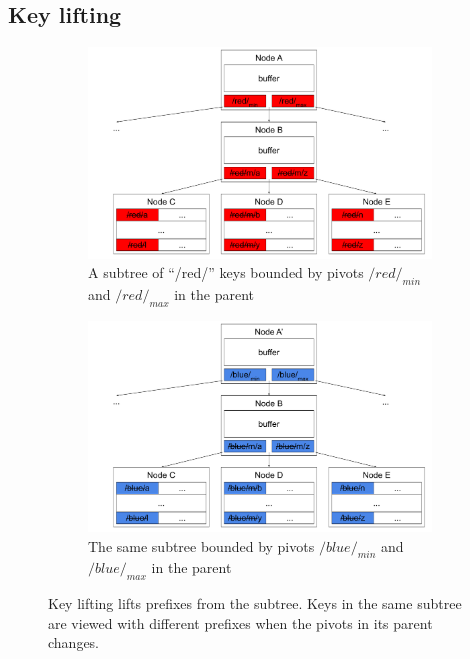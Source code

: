\subsection{Key lifting}

\begin{figure}
    \begin{subfigure}{\textwidth}
        \centering
        \includegraphics[width=.9\linewidth]{fig/lift-1}
        \caption{\label{subfig:lift-1} A subtree of ``/red/'' keys bounded by
            pivots $/red/_{min}$ and $/red/_{max}$ in the parent}
    \end{subfigure}
    \begin{subfigure}{\textwidth}
        \centering
        \includegraphics[width=.9\linewidth]{fig/lift-2}
        \caption{\label{subfig:slice-2} The same subtree bounded by pivots
            $/blue/_{min}$ and $/blue/_{max}$ in the parent}
    \end{subfigure}
    \caption[Key lifting example]{\label{fig:lift}
        Key lifting lifts prefixes from the subtree. Keys in the same subtree
        are viewed with different prefixes when the pivots in its parent
        changes.}
\end{figure}

